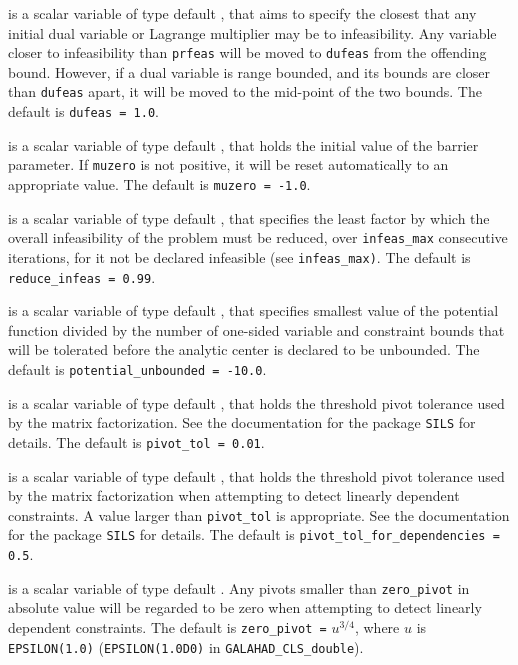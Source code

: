 \documentclass{galahad}
\newcommand{\libraryname}{GALAHAD}
\newcommand{\packagename}{CLS}
\newcommand{\fullpackagename}{\libraryname\_\packagename}
\begin{document}
\begin{description}
 is a scalar variable of type default \realdp, that aims to specify
the closest that any initial dual variable or Lagrange multiplier may be to 
infeasibility. Any variable closer to infeasibility than {\tt prfeas} will be
moved to {\tt dufeas} from the offending bound. However, if a dual variable
is range bounded, and its bounds are closer than {\tt dufeas} apart, it will
be moved to the mid-point of the two bounds.
The default is {\tt dufeas = 1.0}.

  is a scalar variable of type default \realdp, that holds the
initial value of the barrier parameter. If {\tt muzero} is
not positive, it will be reset automatically to an appropriate value.
The default is {\tt muzero = -1.0}.

  is a scalar variable of type default 
\realdp, that specifies the
least factor by which the overall infeasibility of the problem must be reduced,
over {\tt infeas\_max} consecutive iterations, 
for it not be declared infeasible (see {\tt infeas\_max)}.
The default is {\tt reduce\_infeas = 0.99}.

  is a scalar variable of type default 
\realdp, that specifies smallest
value of the potential function divided by the number of one-sided variable and
constraint bounds that will be tolerated before the analytic center is 
declared to be unbounded.
The default is {\tt potential\_u\-nbounded = -10.0}.

  is a scalar variable of type default 
\realdp, that holds the
threshold pivot tolerance used by the matrix factorization.  See 
the documentation for the package {\tt SILS} for details.
The default is {\tt pivot\_tol = 0.01}.

 is a scalar variable of type default 
\realdp, that holds the
threshold pivot  tolerance used by the matrix factorization when 
attempting to detect linearly dependent constraints. A value larger
than  {\tt pivot\_tol} is appropriate. See 
the documentation for the package {\tt SILS} for details.
The default is {\tt pivot\_tol\_for\_dependencies = 0.5}.

 is a scalar variable of type default \realdp.
Any pivots smaller than  {\tt zero\_pivot} in absolute value will be regarded 
to be zero when attempting to detect linearly dependent constraints. 
The default is {\tt zero\_pivot =} $u^{3/4}$,
where $u$ is {\tt EPSILON(1.0)} ({\tt EPSILON(1.0D0)} in 
{\tt \fullpackagename\_dou\-ble}).


\end{description}
\end{document}
